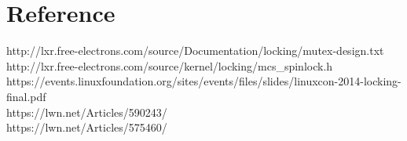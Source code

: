 \documentclass[10pt]{sigplanconf}
\begin{document}
\vspace{50pt}


\section{Reference}
http://lxr.free-electrons.com/source/Documentation/locking/mutex-design.txt\\

\noindent http://lxr.free-electrons.com/source/kernel/locking/mcs\_spinlock.h\\

\noindent https://events.linuxfoundation.org/sites/events/files/slides/linuxcon-2014-locking-final.pdf\\

\noindent https://lwn.net/Articles/590243/\\

\noindent https://lwn.net/Articles/575460/
\end{document}
